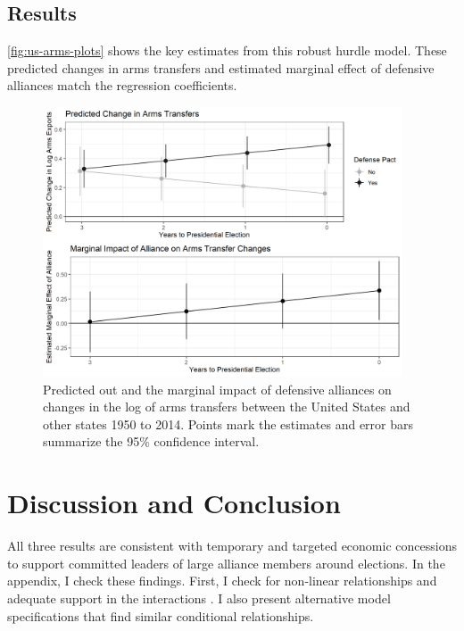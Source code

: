 \documentclass[12pt]{article}
\begin{document}
\subsection{Results}

\autoref{fig:us-arms-plots} shows the key estimates from this robust hurdle model.
These predicted changes in arms transfers and estimated marginal effect of defensive alliances match the regression coefficients.


\begin{figure}[htpb]
	\centering
		\includegraphics[width=0.95\textwidth]{../figures/us-arms-plots.png}
	\caption{Predicted out and the marginal impact of defensive alliances on changes in the log of arms transfers between the United States and other states 1950 to 2014. Points mark the estimates and error bars summarize the 95\% confidence interval.}
	\label{fig:us-arms-plots}
\end{figure}




\section{Discussion and Conclusion}


All three results are consistent with temporary and targeted economic concessions to support committed leaders of large alliance members around elections. 
In the appendix, I check these findings.
First, I check for non-linear relationships and adequate support in the interactions \citep{Hainmuelleretal2019}. 
I also present alternative model specifications that find similar conditional relationships.
\end{document}
